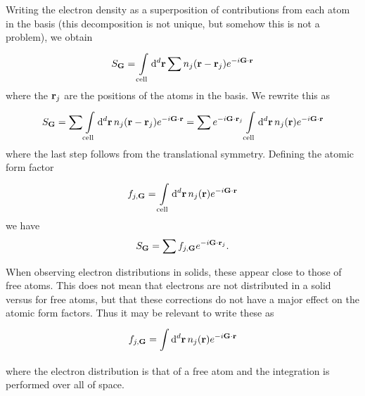 Writing the electron density as a superposition of contributions from each atom in the basis (this decomposition is not unique, but somehow this is not a problem), we obtain
\begin{align*}
	S_{\vb{G}} = \integ[d]{\text{cell}}{}{\vb{r}}{\sum n_{j}(\vb{r} - \vb{r}_{j})e^{-i\vb{G}\cdot\vb{r}}}
\end{align*}
where the $\vb{r}_{j}$ are the positions of the atoms in the basis. We rewrite this as
\begin{align*}
	S_{\vb{G}} = \sum\integ[d]{\text{cell}}{}{\vb{r}}{n_{j}(\vb{r} - \vb{r}_{j})e^{-i\vb{G}\cdot\vb{r}}} = \sum e^{-i\vb{G}\cdot\vb{r}_{j}}\integ[d]{\text{cell}}{}{\vb{r}}{n_{j}(\vb{r})e^{-i\vb{G}\cdot\vb{r}}}
\end{align*}
where the last step follows from the translational symmetry. Defining the atomic form factor
\begin{align*}
	f_{j, \vb{G}} = \integ[d]{\text{cell}}{}{\vb{r}}{n_{j}(\vb{r})e^{-i\vb{G}\cdot\vb{r}}}
\end{align*}
we have
\begin{align*}
	S_{\vb{G}} = \sum f_{j, \vb{G}}e^{-i\vb{G}\cdot\vb{r}_{j}}.
\end{align*}

When observing electron distributions in solids, these appear close to those of free atoms. This does not mean that electrons are not distributed in a solid versus for free atoms, but that these corrections do not have a major effect on the atomic form factors. Thus it may be relevant to write these as
\begin{align*}
	f_{j, \vb{G}} = \integ[d]{}{}{\vb{r}}{n_{j}(\vb{r})e^{-i\vb{G}\cdot\vb{r}}}
\end{align*}
where the electron distribution is that of a free atom and the integration is performed over all of space.